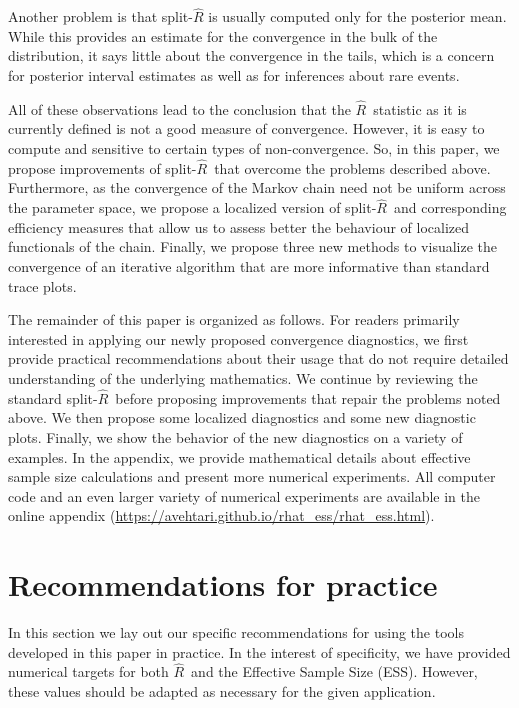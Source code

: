 \documentclass[american,]{article}
\newcommand{\Rhat}{$\widehat{R}$}
\newcommand{\sRhat}{split-$\widehat{R}$}
\theoremstyle{definition}
\begin{document}
Another problem is that split-\(\widehat{R}\) is
usually computed only for the posterior mean. While this provides an estimate 
for the convergence in the bulk of the distribution, it says little about the 
convergence in the tails, which is a concern for posterior 
interval estimates as well as for inferences about rare events.

All of these observations lead to the conclusion that the \Rhat\ statistic 
as it is currently defined is not a good measure of convergence. However, it is 
easy to compute and sensitive to certain types of non-convergence. So, 
in this paper, we propose improvements of \sRhat\ that overcome the  
problems described above. Furthermore, as the convergence
of the Markov chain need not be uniform across the parameter space, we
propose a localized version of \sRhat\ and corresponding efficiency measures 
that allow us to assess better the behaviour of localized 
functionals of the chain. Finally, we propose three new methods to visualize the 
convergence of an iterative algorithm that are more informative than standard 
trace plots.

The remainder of this paper is organized as follows. 
For readers primarily interested in applying our newly proposed convergence 
diagnostics, we first provide practical recommendations about their usage
that do not require detailed understanding of the underlying mathematics.
We continue by reviewing the standard 
\sRhat\, before proposing improvements that repair the problems noted above. 
We then propose some localized diagnostics and some new diagnostic plots. 
Finally, we show the behavior of the new diagnostics on a variety of examples.
In the appendix, we provide mathematical details about effective sample size 
calculations and present more numerical experiments. All computer code and an 
even larger variety of numerical experiments are available in the online 
appendix (\url{https://avehtari.github.io/rhat_ess/rhat_ess.html}).



\section{Recommendations for practice}
In this section we lay out our specific recommendations for using the tools 
developed in this paper in practice. In the interest of specificity, we have 
provided numerical targets for both \Rhat\ and the Effective Sample Size (ESS). 
However, these values should be adapted as necessary for the given application.
\end{document}
